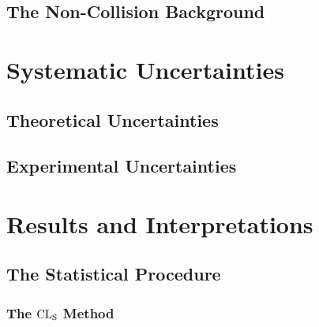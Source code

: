 \documentclass[10pt,twoside,cucitura,classica,english,openany]{toptesi}
\begin{document}


\subsection{The Non-Collision Background}
\label{sec:non-coll-backgr}



\section{Systematic Uncertainties}
\label{sec:syst-uncert}



\subsection{Theoretical Uncertainties}
\label{sec:theor-uncert}



\subsection{Experimental Uncertainties}
\label{sec:exper-uncert}



\section{Results and Interpretations}
\label{sec:results}




% 

\subsection{The Statistical Procedure}
\label{sec:stat-proc}



\subsubsection{The $\mathrm{CL}_\mathrm{S}$ Method}
\label{sec:cls-method}
\end{document}
